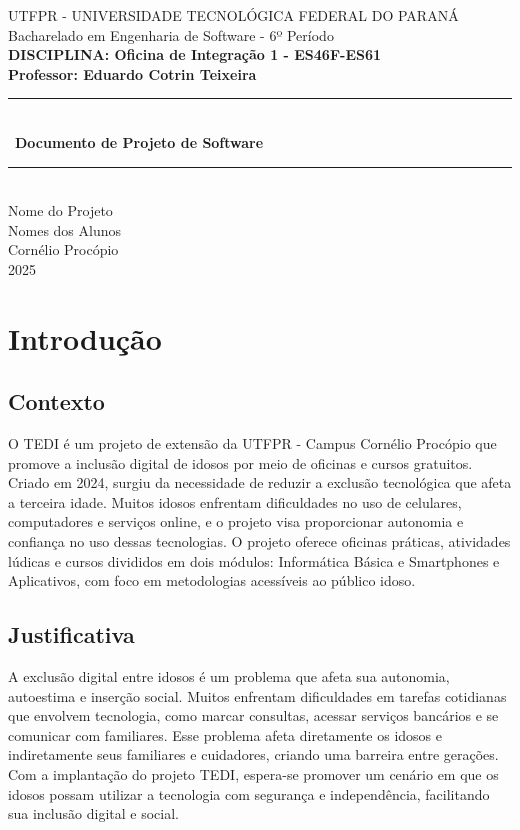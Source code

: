 \documentclass[a4paper,12pt]{article}
\begin{document}
\begin{titlepage}
    \centering
    {\Large UTFPR - UNIVERSIDADE TECNOLÓGICA FEDERAL DO PARANÁ} \\
    \vspace{0.5cm}
    {\large Bacharelado em Engenharia de Software - 6º Período} \\
    \vspace{1cm}
    {\bf DISCIPLINA: Oficina de Integração 1 - ES46F-ES61} \\
    \vspace{0.5cm}
    {\bf Professor: Eduardo Cotrin Teixeira} \\
    \vfill
    \rule{\linewidth}{1.5pt} \\
        \vspace{0.5cm} \
    {\Huge \textbf{Documento de Projeto de Software}} \\
    \rule{\linewidth}{1.5pt} \\
    \vspace{1cm}
    {\Large Nome do Projeto} \\
    \vfill
    {\large Nomes dos Alunos} \\
    \vspace{1cm}
    {\large Cornélio Procópio} \\
    {\large 2025} \\
\end{titlepage}


\tableofcontents
\newpage


\section{Introdução}
\subsection{Contexto}
O TEDI é um projeto de extensão da UTFPR - Campus Cornélio Procópio que promove a inclusão digital de idosos por meio de oficinas e cursos gratuitos. Criado em 2024, surgiu da necessidade de reduzir a exclusão tecnológica que afeta a terceira idade. Muitos idosos enfrentam dificuldades no uso de celulares, computadores e serviços online, e o projeto visa proporcionar autonomia e confiança no uso dessas tecnologias. O projeto oferece oficinas práticas, atividades lúdicas e cursos divididos em dois módulos: Informática Básica e Smartphones e Aplicativos, com foco em metodologias acessíveis ao público idoso.

\subsection{Justificativa}
A exclusão digital entre idosos é um problema que afeta sua autonomia, autoestima e inserção social. Muitos enfrentam dificuldades em tarefas cotidianas que envolvem tecnologia, como marcar consultas, acessar serviços bancários e se comunicar com familiares. Esse problema afeta diretamente os idosos e indiretamente seus familiares e cuidadores, criando uma barreira entre gerações. Com a implantação do projeto TEDI, espera-se promover um cenário em que os idosos possam utilizar a tecnologia com segurança e independência, facilitando sua inclusão digital e social.
\end{document}

